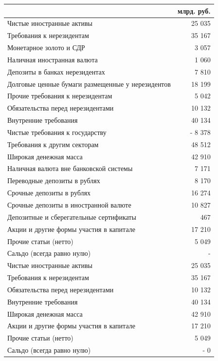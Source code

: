\documentclass[12pt, table, a4paper,twoside]{exam}
\begin{document}
\begin{questions}
\begin{solution}[12em]
	\begin{tabularx}{\linewidth}[b]{@{}>{\raggedright\arraybackslash}Xr@{}}				& млрд. руб.\\
		\toprule
		Чистые иностранные активы &               25 035    \\
		\midrule
		Требования к нерезидентам &               35 167    \\
		Монетарное золото и СДР &                 3 057    \\
		Наличная иностранная валюта &                 1 060    \\
		Депозиты в банках нерезидентах &                 7 810    \\
		Долговые ценные бумаги размещенные у нерезидентов &               18 199    \\
		Прочие требования к нерезидентам &                 5 042    \\
		Обязательства перед нерезидентами &               10 132    \\
		\midrule
		Внутренние требования &               40 134    \\
		Чистые требования к государству & -              8 378    \\
		Требования к другим секторам &               48 512    \\
		\midrule
		Широкая денежная масса &               42 910    \\
		Наличная валюта вне банковской системы &                 7 171    \\
		Переводные депозиты в рублях &                 8 170    \\
		Срочные депозиты в рублях &               16 274    \\
		Срочные депозиты в иностранной валюте &               10 827    \\
		Депозитные и сберегательные сертификаты &                   467    \\
		\midrule
		Акции и другие формы участия в капитале &               17 210    \\
		\midrule
		Прочие статьи (нетто) &                 5 049    \\
		\midrule
		Сальдо (всегда равно нулю) &                      -      \\
		\midrule
		Чистые иностранные активы &               25 035    \\
		Требования к нерезидентам &               35 167    \\
		Обязательства перед нерезидентами &               10 132    \\
		Внутренние требования &               40 134    \\
		Широкая денежная масса &               42 910    \\
		Акции и другие формы участия в капитале &               17 210    \\
		Прочие статьи (нетто) &                 5 049    \\
		\midrule
		Сальдо (всегда равно нулю) & -                     0    \\
		\bottomrule
	\end{tabularx}%
	

\end{solution}
\end{questions}
\end{document}
